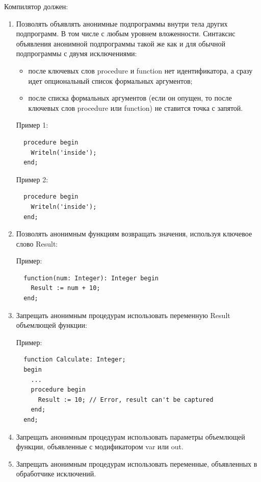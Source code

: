 \documentclass{imcs}
\begin{document}
Компилятор должен:
\begin{enumerate}
    \item Позволять объявлять анонимные подпрограммы внутри тела других подпрограмм. В том числе с любым уровнем
вложенности. Синтаксис объявления анонимной подпрограммы такой же как и для обычной подпрограммы с двумя
исключениями:
        \begin{itemize}
            \item после ключевых слов procedure и function нет идентификатора, а сразу идет опциональный список формальных аргументов;
            \item после списка формальных аргументов (если он опущен, то после ключевых слов procedure или function) не ставится точка с запятой.
        \end{itemize}

         Пример 1:
\begin{lstlisting}
  procedure begin
    Writeln('inside');
  end;
\end{lstlisting}

         Пример 2:
\begin{lstlisting}
  procedure begin
    Writeln('inside');
  end;
\end{lstlisting}

    \item Позволять анонимным функциям возвращать значения, используя ключевое слово Result:

Пример:
\begin{lstlisting}
  function(num: Integer): Integer begin
    Result := num + 10;
  end;
\end{lstlisting}

    \item Запрещать анонимным процедурам использовать переменную Result объемлющей функции:

Пример:
\begin{lstlisting}
  function Calculate: Integer;
  begin
    ...
    procedure begin
      Result := 10; // Error, result can't be captured
    end;
  end;
\end{lstlisting}

    \item Запрещать анонимным процедурам использовать параметры объемлющей функции, объявленные с модификатором
var или out.

    \item Запрещать анонимным процедурам использовать переменные, объявленных в обработчике исключений.


\end{enumerate}
\end{document}

